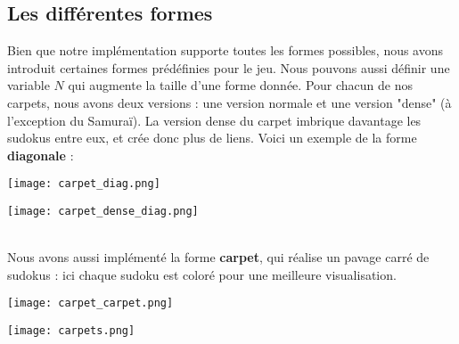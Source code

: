 \documentclass[a4paper]{article}
\begin{document}
\subsection{Les différentes formes}
\begin{minipage}[t]{0.67\textwidth}
    \vspace{0pt}
    
    \qquad Bien que notre implémentation supporte toutes les formes possibles, nous avons introduit certaines formes prédéfinies pour le jeu. Nous pouvons aussi définir une variable $N$ qui augmente la taille d'une forme donnée. Pour chacun de nos carpets, nous avons deux versions : une version normale et une version "dense" (à l'exception du Samuraï). La version dense du carpet imbrique davantage les sudokus entre eux, et crée donc plus de liens. Voici un exemple de la forme \textbf{diagonale} :
    \mbox{}\\[0.1em]
    \begin{minipage}[t]{0.48\textwidth}
        \centering
        \texttt{[image: carpet\_diag.png]}
        \captionsetup{hypcap=false}
    \end{minipage}
    \hfill
    \begin{minipage}[t]{0.48\textwidth}
        \centering
        \texttt{[image: carpet\_dense\_diag.png]}
        \captionsetup{hypcap=false}
    \end{minipage} \\
    
    \qquad Nous avons aussi implémenté la forme \textbf{carpet}, qui réalise un pavage carré de sudokus : ici chaque sudoku est coloré pour une meilleure visualisation.
    \begin{center}
      \texttt{[image: carpet\_carpet.png]}
      \captionsetup{hypcap=false}
    \end{center} 
\end{minipage}
\hfill
\begin{minipage}[t]{0.3\textwidth}
    \vspace{0pt}
     \centering
     \texttt{[image: carpets.png]}
     \captionsetup{hypcap=false}
\end{minipage}
\newpage
\end{document}

